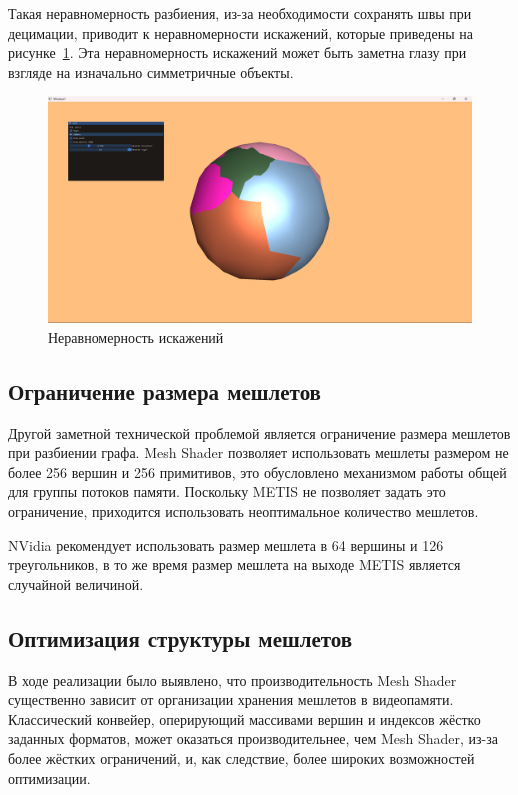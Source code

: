 Такая неравномерность разбиения, из-за необходимости сохранять швы при децимации, приводит к неравномерности искажений, которые приведены на рисунке~\ref{fig:sphere-1}.
Эта неравномерность искажений может быть заметна глазу при взгляде на изначально симметричные объекты.
\begin{figure}[H]
    \centering
    \includegraphics[width=\textwidth]{pics/sphere1.png}
    \caption{Неравномерность искажений}
    \label{fig:sphere-1}
\end{figure}

\subsection*{Ограничение размера мешлетов}
Другой заметной технической проблемой является ограничение размера мешлетов при разбиении графа.
Mesh Shader позволяет использовать мешлеты размером не более 256 вершин и 256 примитивов, это обусловлено механизмом работы общей для группы потоков памяти.
Поскольку METIS не позволяет задать это ограничение, приходится использовать неоптимальное количество мешлетов.

NVidia рекомендует использовать размер мешлета в 64 вершины и 126 треугольников, в то же время размер мешлета на выходе METIS является случайной величиной.

\subsection*{Оптимизация структуры мешлетов}
В ходе реализации было выявлено, что производительность Mesh Shader существенно зависит от организации хранения мешлетов в видеопамяти.
Классический конвейер, оперирующий массивами вершин и индексов жёстко заданных форматов, может оказаться производительнее, чем Mesh Shader, из-за более жёстких ограничений, и, как следствие, более широких возможностей оптимизации.

